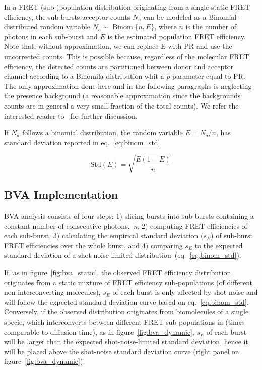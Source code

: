 In a FRET (sub-)population distribution originating from a single static FRET efficiency,
the sub-bursts acceptor counts $N_a$ can be modeled as a Binomial-distributed random variable 
$N_a \sim \operatorname{Binom} \{n, E\}$, where $n$ is the number of photons in each sub-burst and 
$E$ is the estimated population FRET efficiency. Note that, without approximation, we can replace 
E with PR and use the uncorrected counts. This is possible because, regardless of the 
molecular FRET efficiency, the detected counts are partitioned between donor and acceptor channel
according to a Binomila distribution whit a $p$ parameter equal to PR.
The only approximation done here and in the following paragraphs is neglecting the presence background
(a reasonable approximation since the backgrounds counts are in general a very small fraction of
the total counts). 
We refer the interested reader to~\cite{Torella_2011} for further discussion.

If $N_a$ follows a binomial distribution, the random variable $E = N_a/n$,
has standard deviation reported in eq.~\ref{eq:binom_std}. 

\begin{equation}
\label{eq:binom_std}
\operatorname{Std(\textit{E})} = {\sqrt{\frac{E(1 - E)}{n}}}
\end{equation}

\subsection{BVA Implementation}
BVA analysis consists of four steps: 1) slicing bursts into sub-bursts containing a constant number of consecutive photons,~\textit{n}, 2) computing FRET efficiencies of each sub-burst, 3) calculating the empirical standard deviation ($s_E$) of sub-burst FRET efficiencies over the whole burst, and 4) comparing $s_E$ to the expected standard deviation of a shot-noise limited distribution~(eq.~\ref{eq:binom_std}). 

If, as in figure~\ref{fig:bva_static}, the observed FRET efficiency distribution 
originates from a static mixture of FRET efficiency sub-populations (of different 
non-interconverting molecules), 
$s_E$ of each burst is only affected by shot noise and will follow the expected standard deviation curve based on eq.~\ref{eq:binom_std}. 
Conversely, if the observed distribution originates from biomolecules of a single specie, which 
interconverts between different FRET sub-populations in (times comparable to diffusion 
time), as in figure~\ref{fig:bva_dynamic}, $s_E$ of each burst will be larger than the expected 
shot-noise-limited standard deviation, hence it will be placed above the shot-noise standard 
deviation curve (right panel on figure~\ref{fig:bva_dynamic}).
